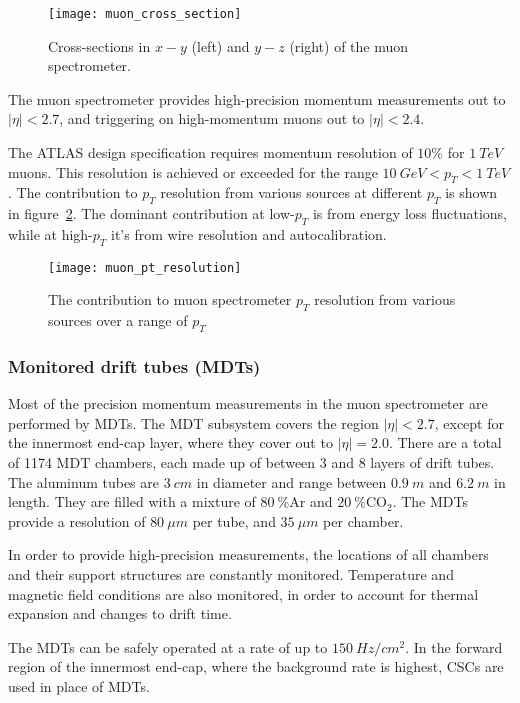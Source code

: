 \begin{figure}[!ht]\centering
\texttt{[image: muon\_cross\_section]}
\caption{Cross-sections in $x-y$ (left) and $y-z$ (right) of the muon spectrometer.}
\label{fig:muon_cross_section}\cite{muon-2003}
\end{figure}

The muon spectrometer provides high-precision momentum measurements out to $|\eta| < 2.7$,
and triggering on high-momentum muons out to $|\eta| < 2.4$.

The ATLAS design specification requires momentum resolution of $10\%$ for $1~TeV$ muons.
This resolution is achieved or exceeded for the range $10~GeV < p_T < 1~TeV$.
The contribution to $p_T$ resolution from various sources at different $p_T$ is shown in figure~\ref{fig:muon_resolution}.
The dominant contribution at low-$p_T$ is from energy loss fluctuations,
while at high-$p_T$ it's from wire resolution and autocalibration.\cite{muon-2003}

\begin{figure}[!ht]\centering
\texttt{[image: muon\_pt\_resolution]}
\caption{The contribution to muon spectrometer $p_T$ resolution from various sources over a range of $p_T$}
\label{fig:muon_resolution}\cite{muon-2003}
\end{figure}

\subsubsection{Monitored drift tubes (MDTs)}
Most of the precision momentum measurements in the muon spectrometer are performed by MDTs.
The MDT subsystem covers the region $|\eta| < 2.7$, except for the innermost end-cap layer,
where they cover out to $|\eta| = 2.0$.
There are a total of 1174 MDT chambers, each made up of between 3 and 8 layers of drift tubes.
The aluminum tubes are $3~cm$ in diameter and range between $0.9~m$ and $6.2~m$ in length.
They are filled with a mixture of $80~\% \mathrm{Ar}$ and  $20~\% \mathrm{CO_2}$.
The MDTs provide a resolution of $80~\mu m$ per tube, and $35~\mu m$ per chamber.

In order to provide high-precision measurements, the locations of all chambers and their support structures are constantly monitored.
Temperature and magnetic field conditions are also monitored, in order to account for thermal expansion and changes to drift time.\cite{muon-2003}

The MDTs can be safely operated at a rate of up to $150~Hz/cm^2$.
In the forward region of the innermost end-cap, where the background rate is highest, CSCs are used in place of MDTs.

